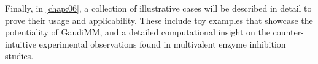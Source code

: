 Finally, in \autoref{chap:06}, a collection of illustrative cases will be described in detail to prove their usage and applicability. These include toy examples that showcase the potentiality of GaudiMM, and a detailed computational insight on the counter-intuitive experimental observations found in multivalent enzyme inhibition studies.

